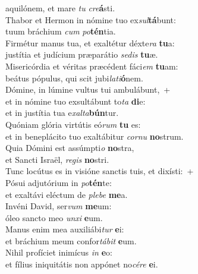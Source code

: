 \evenverse aquilónem, et mare \textit{tu} \textit{cre}\textbf{á}sti.\\
\oddverse Thabor et Hermon in nómine tuo ex\textit{sul}\textbf{tá}bunt:~\*\\
\oddverse tuum bráchium \textit{cum} \textit{po}\textbf{tén}tia.\\
\evenverse Firmétur manus tua, et exaltétur déxte\textit{ra} \textbf{tu}a:~\*\\
\evenverse justítia et judícium præparátio \textit{se}\textit{dis} \textbf{tu}æ.\\
\oddverse Misericórdia et véritas præcédent fáci\textit{em} \textbf{tu}am:~\*\\
\oddverse beátus pópulus, qui scit jubi\textit{la}\textit{ti}\textbf{ó}nem.\\
\evenverse Dómine, in lúmine vultus tui ambulábunt,~+\\
\evenverse  et in nómine tuo exsultábunt to\textit{ta} \textbf{di}e:~\*\\
\evenverse et in justítia tua e\textit{xal}\textit{ta}\textbf{bún}tur.\\
\oddverse Quóniam glória virtútis eó\textit{rum} \textbf{tu} es:~\*\\
\oddverse et in beneplácito tuo exaltábitur \textit{cor}\textit{nu} \textbf{no}strum.\\
\evenverse Quia Dómini est assúmpti\textit{o} \textbf{no}stra,~\*\\
\evenverse et Sancti Israël, \textit{re}\textit{gis} \textbf{no}stri.\\
\oddverse Tunc locútus es in visióne sanctis tuis, et dixísti:~+\\
\oddverse  Pósui adjutórium in \textit{po}\textbf{tén}te:~\*\\
\oddverse et exaltávi eléctum de \textit{ple}\textit{be} \textbf{me}a.\\
\evenverse Invéni David, ser\textit{vum} \textbf{me}um:~\*\\
\evenverse óleo sancto meo \textit{un}\textit{xi} \textbf{e}um.\\
\oddverse Manus enim mea auxiliábi\textit{tur} \textbf{e}i:~\*\\
\oddverse et bráchium meum confor\textit{tá}\textit{bit} \textbf{e}um.\\
\evenverse Nihil profíciet inimícus \textit{in} \textbf{e}o:~\*\\
\evenverse et fílius iniquitátis non appónet no\textit{cé}\textit{re} \textbf{e}i.\\
